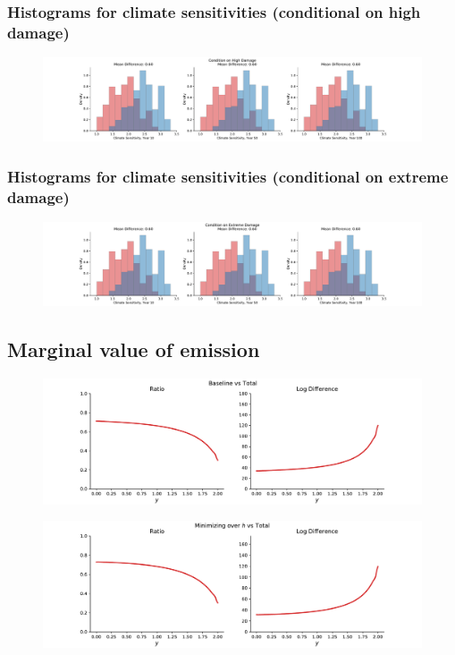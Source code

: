 \documentclass[11pt]{article}
\begin{document}
\subsubsection{Histograms for climate sensitivities (conditional on high damage)}

\begin{figure}[H]
		\center
		\includegraphics[height=.2\textheight]{climate_histogram_high_damage.pdf}
\end{figure}

\subsubsection{Histograms for climate sensitivities (conditional on extreme damage)}

\begin{figure}[H]
		\center
		\includegraphics[height=.2\textheight]{climate_histogram_extreme_damage.pdf}
\end{figure}

\subsection{Marginal value of emission}
\begin{figure}[H]
		\center
		\includegraphics[height=.25\textheight]{me_baseline.pdf}
\end{figure}

\begin{figure}[H]
		\center
		\includegraphics[height=.25\textheight]{me_min_w.pdf}
\end{figure}
\end{document}
